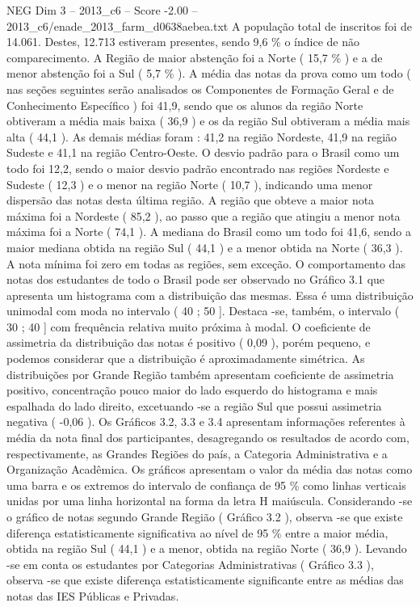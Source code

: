 \begin{textsample}{NEG Dim 3 – 2013\_c6 – Score -2.00 – 2013\_c6/enade\_2013\_farm\_d0638aebea.txt}
A população total de inscritos foi de 14.061.
Destes, 12.713 estiveram presentes, sendo 9,6 \% o índice de não comparecimento.
A Região de maior abstenção foi a Norte ( 15,7 \% ) e a de menor abstenção foi a Sul ( 5,7 \% ).
A média das notas da prova como um todo ( nas seções seguintes serão analisados os Componentes de Formação Geral e de Conhecimento Específico ) foi 41,9, sendo que os alunos da região Norte obtiveram a média mais baixa ( 36,9 ) e os da região Sul obtiveram a média mais alta ( 44,1 ).
As demais médias foram : 41,2 na região Nordeste, 41,9 na região Sudeste e 41,1 na região Centro-Oeste.
O desvio padrão para o Brasil como um todo foi 12,2, sendo o maior desvio padrão encontrado nas regiões Nordeste e Sudeste ( 12,3 ) e o menor na região Norte ( 10,7 ), indicando uma menor dispersão das notas desta última região.
A região que obteve a maior nota máxima foi a Nordeste ( 85,2 ), ao passo que a região que atingiu a menor nota máxima foi a Norte ( 74,1 ).
A mediana do Brasil como um todo foi 41,6, sendo a maior mediana obtida na região Sul ( 44,1 ) e a menor obtida na Norte ( 36,3 ).
A nota mínima foi zero em todas as regiões, sem exceção.
O comportamento das notas dos estudantes de todo o Brasil pode ser observado no Gráfico 3.1 que apresenta um histograma com a distribuição das mesmas.
Essa é uma distribuição unimodal com moda no intervalo ( 40 ; 50 ].
Destaca -se, também, o intervalo ( 30 ; 40 ] com frequência relativa muito próxima à modal.
O coeficiente de assimetria da distribuição das notas é positivo ( 0,09 ), porém pequeno, e podemos considerar que a distribuição é aproximadamente simétrica.
As distribuições por Grande Região também apresentam coeficiente de assimetria positivo, concentração pouco maior do lado esquerdo do histograma e mais espalhada do lado direito, excetuando -se a região Sul que possui assimetria negativa ( -0,06 ).
Os Gráficos 3.2, 3.3 e 3.4 apresentam informações referentes à média da nota final dos participantes, desagregando os resultados de acordo com, respectivamente, as Grandes Regiões do país, a Categoria Administrativa e a Organização Acadêmica.
Os gráficos apresentam o valor da média das notas como uma barra e os extremos do intervalo de confiança de 95 \% como linhas verticais unidas por uma linha horizontal na forma da letra H maiúscula.
Considerando -se o gráfico de notas segundo Grande Região ( Gráfico 3.2 ), observa -se que existe diferença estatisticamente significativa ao nível de 95 \% entre a maior média, obtida na região Sul ( 44,1 ) e a menor, obtida na região Norte ( 36,9 ).
Levando -se em conta os estudantes por Categorias Administrativas ( Gráfico 3.3 ), observa -se que existe diferença estatisticamente significante entre as médias das notas das IES Públicas e Privadas.

\end{textsample}
